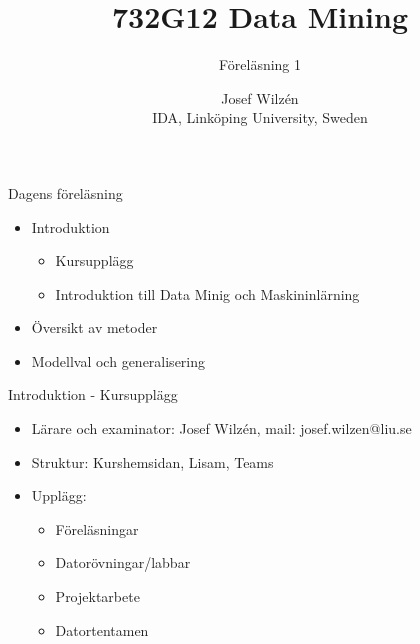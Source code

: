 \documentclass[10pt,english]{beamer}
\title{732G12 Data Mining}
\subtitle{Föreläsning 1}
\date{}
\author{Josef Wilzén \\ IDA, Linköping University, Sweden}
\begin{document}
\maketitle

\begin{frame}{Dagens föreläsning}
    \begin{itemize}
        \item Introduktion
        \begin{itemize}
            \item Kursupplägg
            \item Introduktion till Data Minig och Maskininlärning
        \end{itemize}
        \item Översikt av metoder
        \item Modellval och generalisering
    \end{itemize}
\end{frame}

\begin{frame}{Introduktion - Kursupplägg}
    \begin{itemize}
        \item Lärare och examinator: Josef Wilzén, mail: josef.wilzen@liu.se
        \item Struktur: Kurshemsidan, Lisam, Teams
        \item Upplägg: 
        \begin{itemize}
            \item Föreläsningar
            \item Datorövningar/labbar
            \item Projektarbete
            \item Datortentamen
        \end{itemize}
    \end{itemize}
    
\end{frame}
\end{document}
